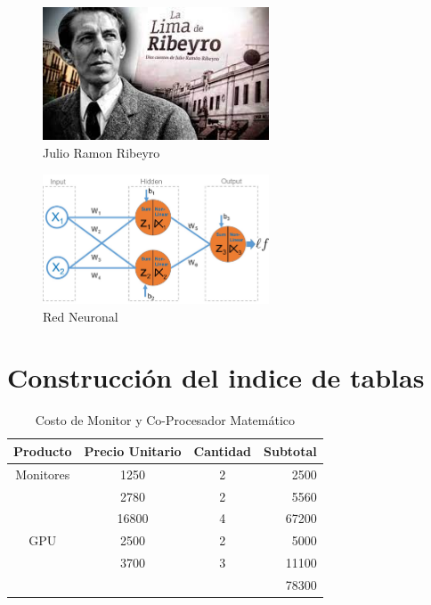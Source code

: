 \documentclass[]{article}
\begin{document}
\begin{figure}[h]
	\centering
	\includegraphics[width=0.6\textwidth]{Figuras/JRR.jpg}
	\caption{Julio Ramon Ribeyro}
	\label{fig: Maestro}
\end{figure}

\lipsum[3-7]
\begin{figure}[h]
	\centering
	\includegraphics[width=0.6\textwidth]{Figuras/Maths-of-Deep-Learning-Neural-Networks-Image-3.jpg}
	\caption{Red Neuronal}
	\label{fig: perceptron}
\end{figure}


\section{Construcción del indice de tablas}
\lipsum[15]
\begin{table}[h]
	\centering
\begin{tabular}{cccr}
	\hline
	Producto & Precio Unitario & Cantidad & Subtotal \\
	\hline
	Monitores & 1250 & 2 & 2500\\
	& 2780 & 2 & 5560 \\
	& 16800 & 4 & 67200 \\
	\hline
	GPU	 	  & 2500 & 2 & 5000\\
	& 3700 & 3 & 11100\\
	\cline{4-4}
	&      &   & 78300
\end{tabular}
\caption{Costo de Monitor y Co-Procesador Matemático}
\label{table:1}
\end{table}

\lipsum[5-9]
\end{document}
